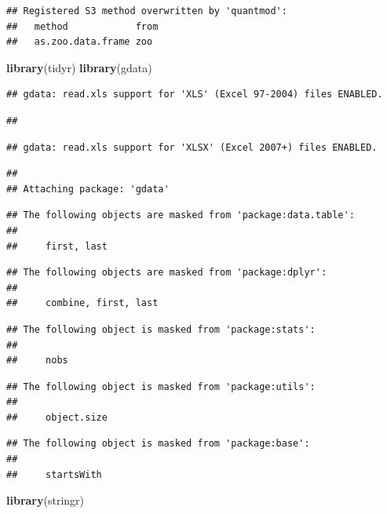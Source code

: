 \documentclass[]{article}
\newenvironment{Shaded}{\begin{snugshade}}{\end{snugshade}}
\newcommand{\KeywordTok}[1]{\textcolor[rgb]{0.13,0.29,0.53}{\textbf{#1}}}
\newcommand{\NormalTok}[1]{#1}
\begin{document}
\begin{verbatim}
## Registered S3 method overwritten by 'quantmod':
##   method            from
##   as.zoo.data.frame zoo
\end{verbatim}

\begin{Shaded}
\begin{Highlighting}[]
\KeywordTok{library}\NormalTok{(tidyr)}
\KeywordTok{library}\NormalTok{(gdata)}
\end{Highlighting}
\end{Shaded}

\begin{verbatim}
## gdata: read.xls support for 'XLS' (Excel 97-2004) files ENABLED.
\end{verbatim}

\begin{verbatim}
## 
\end{verbatim}

\begin{verbatim}
## gdata: read.xls support for 'XLSX' (Excel 2007+) files ENABLED.
\end{verbatim}

\begin{verbatim}
## 
## Attaching package: 'gdata'
\end{verbatim}

\begin{verbatim}
## The following objects are masked from 'package:data.table':
## 
##     first, last
\end{verbatim}

\begin{verbatim}
## The following objects are masked from 'package:dplyr':
## 
##     combine, first, last
\end{verbatim}

\begin{verbatim}
## The following object is masked from 'package:stats':
## 
##     nobs
\end{verbatim}

\begin{verbatim}
## The following object is masked from 'package:utils':
## 
##     object.size
\end{verbatim}

\begin{verbatim}
## The following object is masked from 'package:base':
## 
##     startsWith
\end{verbatim}

\begin{Shaded}
\begin{Highlighting}[]
\KeywordTok{library}\NormalTok{(stringr)}
\end{Highlighting}
\end{Shaded}
\end{document}

